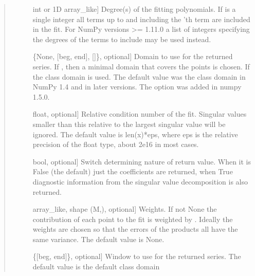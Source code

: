 \documentclass[letterpaper,10pt,english]{sphinxmanual}
\begin{document}
\begin{fulllineitems}
\begin{fulllineitems}
\begin{quote}
\begin{description}
\begin{description}
\item[{}] \leavevmode{[}int or 1\sphinxhyphen{}D array\_like{]}
Degree(s) of the fitting polynomials. If  is a single integer
all terms up to and including the ’th term are included in the
fit. For NumPy versions >= 1.11.0 a list of integers specifying the
degrees of the terms to include may be used instead.

\item[{}] \leavevmode{[}\{None, {[}beg, end{]}, {[}{]}\}, optional{]}
Domain to use for the returned series. If ,
then a minimal domain that covers the points  is chosen.  If
\sphinxcode{\sphinxupquote{{[}{]}}} the class domain is used. The default value was the
class domain in NumPy 1.4 and  in later versions.
The \sphinxcode{\sphinxupquote{{[}{]}}} option was added in numpy 1.5.0.

\item[{}] \leavevmode{[}float, optional{]}
Relative condition number of the fit. Singular values smaller
than this relative to the largest singular value will be
ignored. The default value is len(x)*eps, where eps is the
relative precision of the float type, about 2e\sphinxhyphen{}16 in most
cases.

\item[{}] \leavevmode{[}bool, optional{]}
Switch determining nature of return value. When it is False
(the default) just the coefficients are returned, when True
diagnostic information from the singular value decomposition is
also returned.

\item[{}] \leavevmode{[}array\_like, shape (M,), optional{]}
Weights. If not None the contribution of each point
 to the fit is weighted by . Ideally the
weights are chosen so that the errors of the products
 all have the same variance.  The default value is
None.


\item[{}] \leavevmode{[}\{{[}beg, end{]}\}, optional{]}
Window to use for the returned series. The default
value is the default class domain


\end{description}
\end{description}
\end{quote}
\end{fulllineitems}
\end{fulllineitems}
\end{document}
